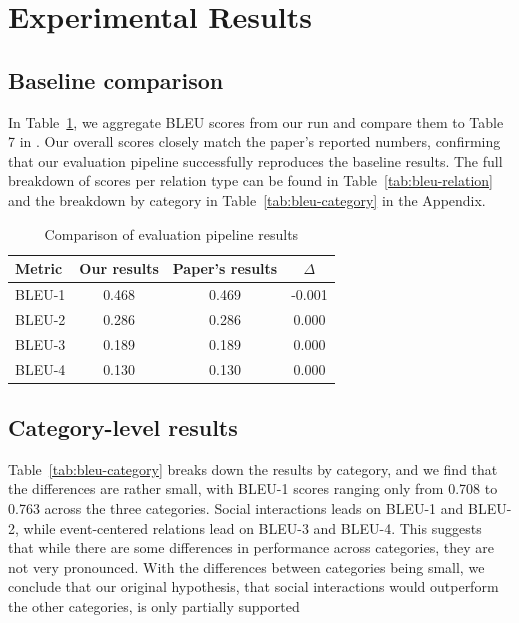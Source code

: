 \section{Experimental Results}
\label{sec:experimentalresults}


\subsection{Baseline comparison}

In Table~\ref{tab:baseline-comparison}, we aggregate BLEU scores from our run and compare them to Table 7 in \citet{hwang2021cometatomic}. Our overall scores closely match the paper's reported numbers, confirming that our evaluation pipeline successfully reproduces the baseline results. The full breakdown of scores per relation type can be found in Table~\ref{tab:bleu-relation} and the breakdown by category in Table~\ref{tab:bleu-category} in the Appendix. 


\begin{table}[h]
	\begin{tabular}{|l|c|c|c|}
		\hline
		\textbf{Metric} & \textbf{Our results} & \textbf{Paper's results} & \textbf{$\Delta$} \\
		\hline
		BLEU-1          & 0.468                & 0.469                    & -0.001            \\
		BLEU-2          & 0.286                & 0.286                    & 0.000             \\
		BLEU-3          & 0.189                & 0.189                    & 0.000             \\
		BLEU-4          & 0.130                & 0.130                    & 0.000             \\
		\hline
	\end{tabular}
	\caption{Comparison of evaluation pipeline results}
	\label{tab:baseline-comparison}
\end{table}





\subsection{Category-level results}

Table~\ref{tab:bleu-category} breaks down the results by category, and we find that the differences are rather small, with BLEU-1 scores ranging only from 0.708 to 0.763 across the three categories. Social interactions leads on BLEU-1 and BLEU-2, while event-centered relations lead on BLEU-3 and BLEU-4. This suggests that while there are some differences in performance across categories, they are not very pronounced. With the differences between categories being small, we conclude that our original hypothesis, that social interactions would outperform the other categories, is only partially supported


